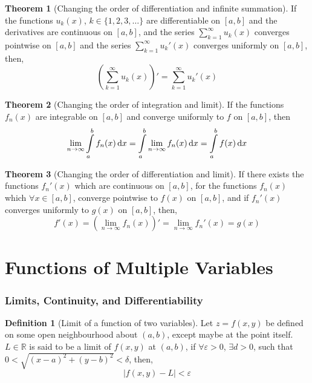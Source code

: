 \documentclass[fleqn, a4paper, 8pt, twoside]{amsart}
\theoremstyle{definition}
\theoremstyle{bluedefinition}
\newtheorem{definition}{Definition}
\theoremstyle{redtheorem}
\newtheorem{theorem}{Theorem}
\begin{document}
\begin{multicols}{2}
\begin{spacing}{0.7}
\begin{theorem}[Changing the order of differentiation and infinite summation]
	If the functions $u_k(x)$, $k \in \{1, 2, 3, \dots\}$ are differentiable on $[a,b]$ and the derivatives are continuous on $[a,b]$, and the series $\sum\limits_{k = 1}^{\infty} u_k(x)$ converges pointwise on $[a,b]$ and the series $\sum\limits_{k = 1}^{\infty} {u_k}'(x)$ converges uniformly on $[a,b]$, then,
	\begin{equation*}
		\left( \sum\limits_{k = 1}^{\infty} u_k(x) \right)' = \sum\limits_{k = 1}^{\infty} {u_k}'(x)
	\end{equation*}
\end{theorem}

\begin{theorem}[Changing the order of integration and limit]
	If the functions $f_n(x)$ are integrable on $[a,b]$ and converge uniformly to $f$ on $[a,b]$, then
	\begin{equation*}
		\lim\limits_{n \to \infty} \int\limits_{a}^{b} f_n(x) \dif x = \int\limits_{a}^{b} \lim\limits_{n \to \infty} f_n(x) \dif x = \int\limits_{a}^{b} f(x) \dif x
	\end{equation*}
\end{theorem}

\begin{theorem}[Changing the order of differentiation and limit]
	If there exists the functions ${f_n}'(x)$ which are continuous on $[a,b]$, for the functions $f_n(x)$ which $\forall x \in [a,b]$, converge pointwise to $f(x)$ on $[a,b]$, and if ${f_n}'(x)$ converges uniformly to $g(x)$ on $[a,b]$, then,
	\begin{equation*}
		f'(x) = \left( \lim\limits_{n \to \infty} f_n(x) \right)' = \lim\limits_{n \to \infty} {f_n}'(x) = g(x) 
	\end{equation*}
\end{theorem}

\part{Functions of Multiple Variables}

\section{Limits, Continuity, and Differentiability}

\begin{definition}[Limit of a function of two variables]
	Let $z = f(x,y)$ be defined on some open neighbourhood about $(a,b)$, except maybe at the point itself.
	$L \in \mathbb{R}$ is said to be a limit of $f(x,y)$ at $(a,b)$, if $\forall \varepsilon > 0$, $\exists d > 0$, such that $0 < \sqrt{(x - a)^2 + (y - b)^2} < \delta$, then,
	\begin{equation*}
		|f(x,y) - L| < \varepsilon
	\end{equation*}
\end{definition}


\end{spacing}
\end{multicols}
\end{document}

